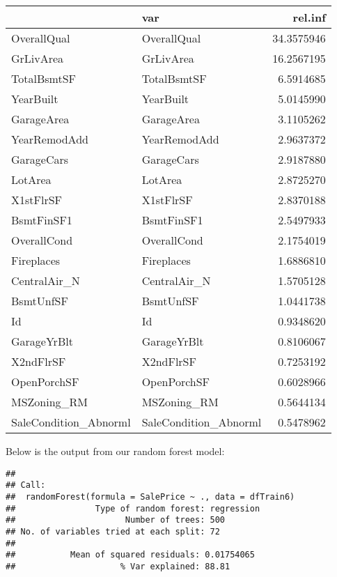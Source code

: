 \documentclass[
]{article}
\begin{document}
\begin{longtable}[]{@{}llr@{}}
\toprule
& var & rel.inf \\
\midrule
\endhead
OverallQual & OverallQual & 34.3575946 \\
GrLivArea & GrLivArea & 16.2567195 \\
TotalBsmtSF & TotalBsmtSF & 6.5914685 \\
YearBuilt & YearBuilt & 5.0145990 \\
GarageArea & GarageArea & 3.1105262 \\
YearRemodAdd & YearRemodAdd & 2.9637372 \\
GarageCars & GarageCars & 2.9187880 \\
LotArea & LotArea & 2.8725270 \\
X1stFlrSF & X1stFlrSF & 2.8370188 \\
BsmtFinSF1 & BsmtFinSF1 & 2.5497933 \\
OverallCond & OverallCond & 2.1754019 \\
Fireplaces & Fireplaces & 1.6886810 \\
CentralAir\_N & CentralAir\_N & 1.5705128 \\
BsmtUnfSF & BsmtUnfSF & 1.0441738 \\
Id & Id & 0.9348620 \\
GarageYrBlt & GarageYrBlt & 0.8106067 \\
X2ndFlrSF & X2ndFlrSF & 0.7253192 \\
OpenPorchSF & OpenPorchSF & 0.6028966 \\
MSZoning\_RM & MSZoning\_RM & 0.5644134 \\
SaleCondition\_Abnorml & SaleCondition\_Abnorml & 0.5478962 \\
\bottomrule
\end{longtable}

Below is the output from our random forest model:

\begin{verbatim}
## 
## Call:
##  randomForest(formula = SalePrice ~ ., data = dfTrain6) 
##                Type of random forest: regression
##                      Number of trees: 500
## No. of variables tried at each split: 72
## 
##           Mean of squared residuals: 0.01754065
##                     % Var explained: 88.81
\end{verbatim}
\end{document}
